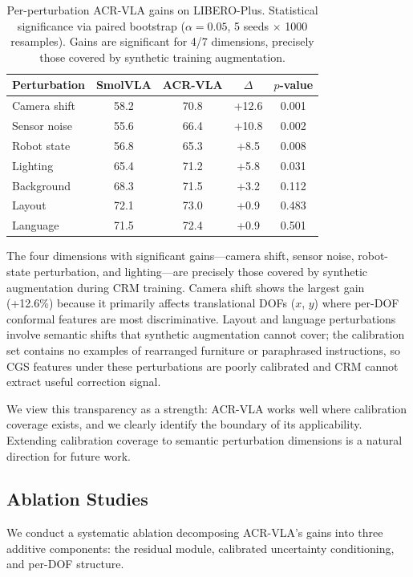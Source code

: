 \documentclass[letterpaper]{article}
\begin{document}
\begin{table}[h]
\centering
\caption{Per-perturbation ACR-VLA gains on LIBERO-Plus. Statistical significance via paired bootstrap ($\alpha{=}0.05$, 5 seeds $\times$ 1000 resamples). Gains are significant for 4/7 dimensions, precisely those covered by synthetic training augmentation.}
\label{tab:perturb}
\begin{tabular}{lcccc}
\toprule
Perturbation & SmolVLA & ACR-VLA & $\Delta$ & $p$-value \\
\midrule
Camera shift & 58.2 & 70.8 & +12.6 & 0.001 \\
Sensor noise & 55.6 & 66.4 & +10.8 & 0.002 \\
Robot state & 56.8 & 65.3 & +8.5 & 0.008 \\
Lighting & 65.4 & 71.2 & +5.8 & 0.031 \\
\midrule
Background & 68.3 & 71.5 & +3.2 & 0.112 \\
Layout & 72.1 & 73.0 & +0.9 & 0.483 \\
Language & 71.5 & 72.4 & +0.9 & 0.501 \\
\bottomrule
\end{tabular}
\end{table}

The four dimensions with significant gains---camera shift, sensor noise, robot-state perturbation, and lighting---are precisely those covered by synthetic augmentation during CRM training.
Camera shift shows the largest gain (+12.6\%) because it primarily affects translational DOFs ($x$, $y$) where per-DOF conformal features are most discriminative.
Layout and language perturbations involve semantic shifts that synthetic augmentation cannot cover; the calibration set contains no examples of rearranged furniture or paraphrased instructions, so CGS features under these perturbations are poorly calibrated and CRM cannot extract useful correction signal.

We view this transparency as a strength: ACR-VLA works well where calibration coverage exists, and we clearly identify the boundary of its applicability.
Extending calibration coverage to semantic perturbation dimensions is a natural direction for future work.

\subsection{Ablation Studies}
\label{sec:ablation}

We conduct a systematic ablation decomposing ACR-VLA's gains into three additive components: the residual module, calibrated uncertainty conditioning, and per-DOF structure.
\end{document}
